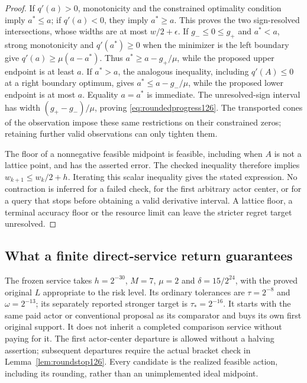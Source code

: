 \begin{proof}
If $q'(a)>0$, monotonicity and the constrained optimality condition
imply $a^*\le a$; if $q'(a)<0$, they imply $a^*\ge a$.  This
proves the two sign-resolved intersections, whose widths are at most
$w/2+\epsilon$.  If $g_-\le0\le g_+$ and $a^*<a$, strong
monotonicity and $q'(a^*)\ge0$ when the minimizer is the left
boundary give $q'(a)\ge\mu(a-a^*)$.  Thus
$a^*\ge a-g_+/\mu$, while the proposed upper endpoint is at
least $a$.  If $a^*>a$, the analogous inequality, including
$q'(A)\le0$ at a right boundary optimum, gives
$a^*\le a-g_-/\mu$, while the proposed lower endpoint is at
most $a$.  Equality $a=a^*$ is immediate.  The unresolved-sign
interval has width $(g_+-g_-)/\mu$, proving
\eqref{eq:roundedprogress126}.  The transported cones of the
observation impose these same restrictions on their constrained
zeros; retaining further valid observations can only tighten them.

The floor of a nonnegative feasible midpoint is feasible, including
when $A$ is not a lattice point, and has the asserted error.  The
checked inequality therefore implies
$w_{k+1}\le w_k/2+h$.  Iterating this scalar inequality gives the
stated expression.  No contraction is inferred for a failed check,
for the first arbitrary actor center, or for a query that stops
before obtaining a valid derivative interval.  A lattice floor,
a terminal accuracy floor or the resource limit can leave the
stricter regret target unresolved.
\end{proof}

\subsection{What a finite direct-service return guarantees}

The frozen service takes $h=2^{-30}$, $M=7$, $\mu=2$ and
$\delta=15/2^{24}$, with the proved original $L$ appropriate to the
risk level.  Its ordinary tolerances are $\tau=2^{-8}$ and
$\omega=2^{-13}$; its separately reported stronger target is
$\tau_*=2^{-16}$.  It starts with the same paid actor or conventional
proposal as its comparator and buys its own first original support.
It does not inherit a completed comparison service without paying
for it.  The first actor-center departure is allowed without a
halving assertion; subsequent departures require the actual
bracket check in Lemma~\ref{lem:roundstop126}.  Every candidate is
the realized feasible action, including its rounding, rather than
an unimplemented ideal midpoint.

